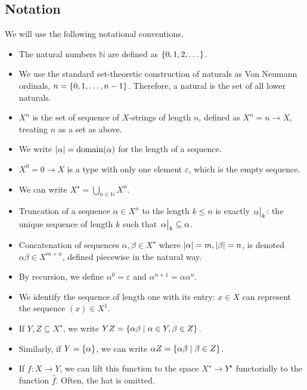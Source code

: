\subsection{Notation}
We will use the following notational conventions.
\begin{itemize}
	\item The natural numbers \( \mathbb N \) are defined as \( \qty{0, 1, 2, \dots} \).
	\item We use the standard set-theoretic construction of naturals as Von Neumann ordinals, \( n = \qty{0, 1, \dots, n-1} \). Therefore, a natural is the set of all lower naturals.
	\item \( X^n \) is the set of sequence of \( X \)-strings of length \( n \), defined as \( X^n = n \to X \), treating \( n \) as a set as above.
	\item We write \( \abs{\alpha} = \mathrm{domain}(\alpha) \) for the length of a sequence.
	\item \( X^0 = 0 \to X \) is a type with only one element \( \varepsilon \), which is the empty sequence.
	\item We can write \( X^\star = \bigcup_{n \in \mathbb N} X^n \).
	\item Truncation of a sequence \( \alpha \in X^n \) to the length \( k \leq n \) is exactly \( \eval{\alpha}_k \): the unique sequence of length \( k \) such that \( \eval{\alpha}_k \subseteq \alpha \).
	\item Concatenation of sequences \( \alpha, \beta \in X^\star \) where \( \abs{\alpha} = m, \abs{\beta} = n \), is denoted \( \alpha\beta \in X^{m + n} \), defined piecewise in the natural way.
	\item By recursion, we define \( \alpha^0 = \varepsilon \) and \( \alpha^{n+1} = \alpha \alpha^n \).
	\item We identify the sequence of length one with its entry: \( x \in X \) can represent the sequence \( (x) \in X^1 \).
	\item If \( Y, Z \subseteq X^\star \), we write \( YZ = \qty{\alpha\beta \mid \alpha \in Y, \beta \in Z} \).
	\item Similarly, if \( Y = \qty{\alpha} \), we can write \( \alpha Z = \qty{\alpha\beta \mid \beta \in Z} \).
	\item If \( f \colon X \to Y \), we can lift this function to the space \( X^\star \to Y^\star \) functorially to the function \( \hat f \). Often, the hat is omitted.
\end{itemize}
